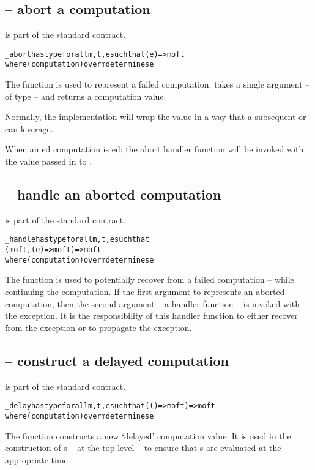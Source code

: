 \subsection{ -- abort a computation}
\label{abortFunction}
 is part of the standard  contract.
\begin{alltt}
\_abort has type for all m,t,e such that (e)=>m of t
                 where (computation) over m determines e
\end{alltt}

The  function is used to represent a failed computation.  takes a single argument -- of type  -- and returns a computation value.

\begin{aside}
Normally, the  implementation will wrap the  value in a way that a subsequent  or  can leverage.
\end{aside}

When an ed computation is ed; the abort handler function will be  invoked with the value passed in to .

\subsection{ -- handle an aborted computation}
\label{handleFunction}
 is part of the standard  contract.
\begin{alltt}
\_handle has type for all m,t,e such that 
                  (m of t, (e)=>m of t) => m of t
                  where (computation) over m determines e
\end{alltt}

The  function is used to potentially recover from a failed computation -- while continuing the computation. If the first argument to  represents an aborted computation, then the second argument -- a handler function -- is invoked with the exception. It is the responsibility of this handler function to either recover from the exception or to propagate the exception.

\subsection{ -- construct a delayed computation}
\label{delayFunction}
 is part of the standard  contract.
\begin{alltt}
\_delay has type for all m,t,e such that (()=>m of t)=>m of t
                 where (computation) over m determines e
\end{alltt}
The  function constructs a new `delayed' computation value. It is used in the construction of s -- at the top level -- to ensure that s are evaluated at the appropriate time.

